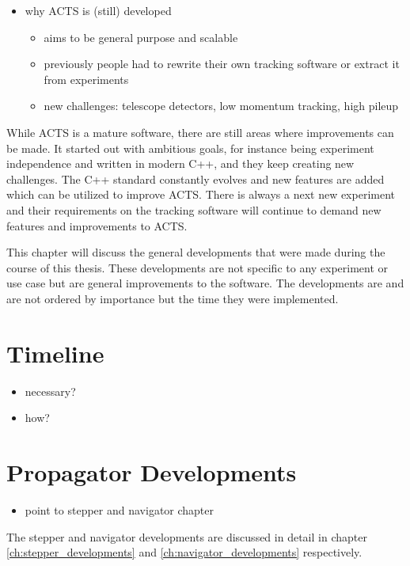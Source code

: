 \begin{itemize}
    \color{red}
    \item why ACTS is (still) developed
    \begin{itemize}
        \item aims to be general purpose and scalable
        \item previously people had to rewrite their own tracking software or extract it from experiments
        \item new challenges: telescope detectors, low momentum tracking, high pileup
    \end{itemize}
\end{itemize}

While ACTS is a mature software, there are still areas where improvements can be made. It started out with ambitious goals, for instance being experiment independence and written in modern C++, and they keep creating new challenges. The C++ standard constantly evolves and new features are added which can be utilized to improve ACTS. There is always a next new experiment and their requirements on the tracking software will continue to demand new features and improvements to ACTS.

This chapter will discuss the general developments that were made during the course of this thesis. These developments are not specific to any experiment or use case but are general improvements to the software. The developments are  and are not ordered by importance but the time they were implemented.

\section{Timeline}

\begin{itemize}
    \color{red}
    \item necessary?
    \item how?
\end{itemize}

\section{Propagator Developments}

\begin{itemize}
    \color{red}
    \item point to stepper and navigator chapter
\end{itemize}

The stepper and navigator developments are discussed in detail in chapter \ref{ch:stepper_developments} and \ref{ch:navigator_developments} respectively.

